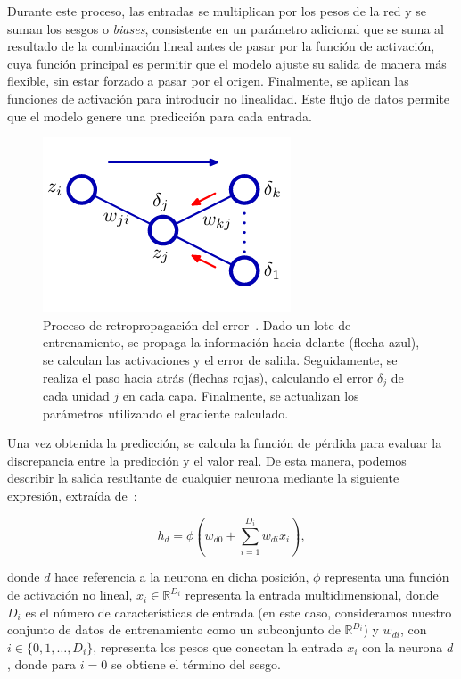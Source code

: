 Durante este proceso, las entradas se multiplican por los pesos de la red y se suman los sesgos o \emph{biases}, consistente en un parámetro adicional que se suma al resultado de la combinación lineal antes de pasar por la función de activación, cuya función principal es permitir que el modelo ajuste su salida de manera más flexible, sin estar forzado a pasar por el origen. Finalmente, se aplican las funciones de activación para introducir no linealidad. Este flujo de datos permite que el modelo genere una predicción para cada entrada.

\begin{figure}[h]
    \centering
    \includegraphics[width=0.3\linewidth]{img/aprendizajegd.png}
    \caption[Proceso de retropropagación del error~\cite{Bishop2006}.]{Proceso de retropropagación del error~\cite{Bishop2006}. Dado un lote de entrenamiento, se propaga la información hacia delante (flecha azul), se calculan las activaciones y el error de salida. Seguidamente, se realiza el paso hacia atrás (flechas rojas), calculando el error $\delta_j$ de cada unidad $j$ en cada capa. Finalmente, se actualizan los parámetros utilizando el gradiente calculado.}\label{fig:aprendizajegd}
\end{figure}

Una vez obtenida la predicción, se calcula la función de pérdida para evaluar la discrepancia entre la predicción y el valor real. De esta manera, podemos describir la salida resultante de cualquier neurona mediante la siguiente expresión, extraída de~\cite{Prince2023}:

\begin{equation}
    h_d = \phi \left( w_{d0} + \sum_{i=1}^{D_i} w_{di} x_i \right),
    \label{eq:hidden_unit}
\end{equation}

donde $d$ hace referencia a la neurona en dicha posición, $\phi$ representa una función de activación no lineal, $x_i \in \mathbb{R}^{D_i}$ representa la entrada multidimensional, donde $D_i$ es el número de características de entrada (en este caso, consideramos nuestro conjunto de datos de entrenamiento como un subconjunto de $\mathbb{R}^{D_i}$) y $w_{di}$, con $i \in \{0,1,\ldots,D_i\}$, representa los pesos que conectan la entrada $x_i$ con la neurona $d$, donde para $i = 0$ se obtiene el término del sesgo.

